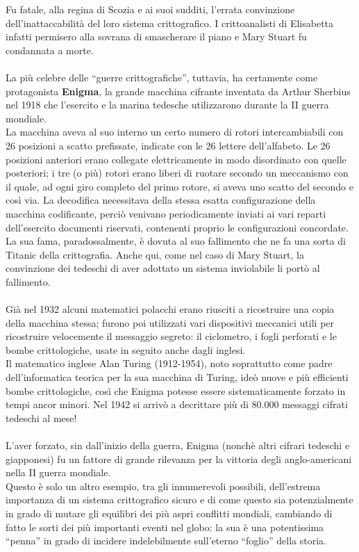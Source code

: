 Fu fatale, alla regina di Scozia e ai suoi sudditi, l’errata convinzione dell'inattaccabilità del loro sistema crittografico. I crittoanalisti di Elisabetta infatti permisero alla sovrana di smascherare il piano e Mary Stuart fu condannata a morte.\\\\
La più celebre delle ``guerre crittografiche'', tuttavia, ha certamente come protagonista \textbf{Enigma}, la grande macchina cifrante inventata da Arthur Sherbius nel 1918 che l'esercito e la marina tedesche utilizzarono durante la II guerra mondiale.\\
La macchina aveva al suo interno un certo numero di rotori intercambiabili con 26 posizioni a scatto prefissate, indicate con le 26 lettere dell'alfabeto. Le 26 posizioni anteriori erano collegate elettricamente in modo disordinato con quelle posteriori; i tre (o più) rotori erano liberi di ruotare secondo un meccanismo con il quale, ad ogni giro completo del primo rotore, si aveva uno scatto del secondo e così via.
La decodifica necessitava della stessa esatta configurazione della macchina codificante, perciò venivano periodicamente inviati ai vari reparti dell'esercito documenti riservati, contenenti proprio le configurazioni concordate.\\
La sua fama, paradossalmente, è dovuta al suo fallimento che ne fa una sorta di Titanic della crittografia. Anche qui, come nel caso di Mary Stuart, la convinzione dei tedeschi di aver adottato un sistema inviolabile li portò al fallimento.\\\\
Già nel 1932 alcuni matematici polacchi erano riusciti a ricostruire una copia della macchina stessa; furono poi utilizzati vari dispositivi meccanici utili per ricostruire velocemente il messaggio segreto: il ciclometro, i fogli perforati e le bombe crittologiche, usate in seguito anche dagli inglesi.\\
Il matematico inglese Alan Turing (1912-1954), noto soprattutto come padre dell'informatica teorica per la sua macchina di Turing, ideò nuove e più efficienti bombe crittologiche, così che Enigma potesse essere sistematicamente forzato in tempi ancor minori. Nel 1942 si arrivò a decrittare più di 80.000 messaggi cifrati tedeschi al mese!\\\\
L'aver forzato, sin dall'inizio della guerra, Enigma (nonchè altri cifrari tedeschi e giapponesi) fu un fattore di grande rilevanza per la vittoria degli anglo-americani nella II guerra mondiale.\\
Questo è solo un altro esempio, tra gli innumerevoli possibili, dell'estrema importanza di un sistema crittografico sicuro e di come questo sia potenzialmente in grado di mutare gli equilibri dei più aspri conflitti mondiali, cambiando di fatto le sorti dei più importanti 
eventi nel globo: la sua è una potentissima ``penna'' in grado di incidere indelebilmente sull'eterno ``foglio'' della storia.